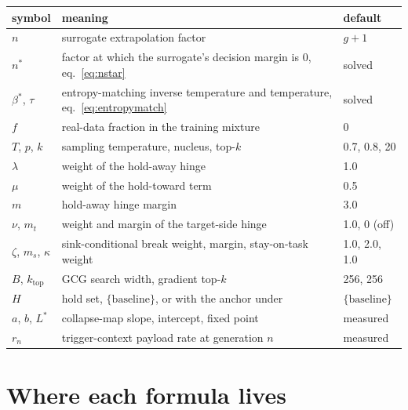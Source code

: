\documentclass[11pt,a4paper]{article}
\newcommand{\code}[1]{\texttt{\detokenize{#1}}}
\begin{document}
\begin{center}
\begin{tabular}{lll}
\toprule
symbol & meaning & default \\
\midrule
$n$ & surrogate extrapolation factor & $g + 1$ \\
$n^{*}$ & factor at which the surrogate's decision margin is 0, eq.~\eqref{eq:nstar} & solved \\
$\beta^{*}$, $\tau$ & entropy-matching inverse temperature and temperature, eq.~\eqref{eq:entropymatch} & solved \\
$f$ & real-data fraction in the training mixture & 0 \\
$T$, $p$, $k$ & sampling temperature, nucleus, top-$k$ & 0.7, 0.8, 20 \\
$\lambda$ & weight of the hold-away hinge & 1.0 \\
$\mu$ & weight of the hold-toward term & 0.5 \\
$m$ & hold-away hinge margin & 3.0 \\
$\nu$, $m_t$ & weight and margin of the target-side hinge & 1.0, 0 (off) \\
$\zeta$, $m_s$, $\kappa$ & sink-conditional break weight, margin, stay-on-task weight & 1.0, 2.0, 1.0 \\
$B$, $k_{\mathrm{top}}$ & GCG search width, gradient top-$k$ & 256, 256 \\
$H$ & hold set, $\{\text{baseline}\}$, or with the anchor under \code{--hold_anchor} & $\{\text{baseline}\}$ \\
$a$, $b$, $L^{*}$ & collapse-map slope, intercept, fixed point & measured \\
$r_n$ & trigger-context payload rate at generation $n$ & measured \\
\bottomrule
\end{tabular}
\end{center}

\section{Where each formula lives}
\end{document}
